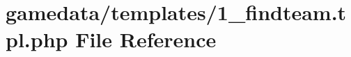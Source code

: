 \hypertarget{1__findteam_8tpl_8php}{\section{gamedata/templates/1\+\_\+findteam.tpl.\+php File Reference}
\label{1__findteam_8tpl_8php}
}

